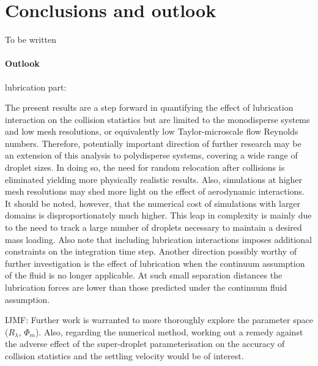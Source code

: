 \documentclass[../thesis.tex]{subfiles}
\begin{document}
\section{Conclusions and outlook\label{sec:con}}

To be written

\paragraph{Outlook}

lubrication part:

The present results are a step forward in quantifying the effect of lubrication interaction on the collision statistics but are limited to the monodisperse systems and low mesh resolutions, or equivalently low Taylor-microscale flow Reynolds numbers. Therefore, potentially important direction of further research may be an extension of this analysis to polydisperse systems, covering a wide range of droplet sizes. In doing so, the need for random relocation after collisions is eliminated yielding more physically realistic results. Also, simulations at higher mesh resolutions may shed more light on the effect of aerodynamic interactions. It should be noted, however, that the numerical cost of simulations with larger domains is disproportionately much higher. This leap in complexity is mainly due to the need to track a large number of droplets necessary to maintain a desired mass loading. Also note that including lubrication interactions imposes additional constraints on the integration time step. Another direction possibly worthy of further investigation is the effect of lubrication when the continuum assumption of the fluid is no longer applicable. At such small separation distances the lubrication forces are lower than those predicted under the continuum fluid assumption.

IJMF: Further work is warranted to more thoroughly explore the parameter space ($R_{\lambda}$, $\Phi_m$). Also, regarding the numerical method, working out a remedy against the adverse effect of the super-droplet parameterisation on the accuracy of collision statistics and the settling velocity would be of interest.


%
%
\newpage
\end{document}

